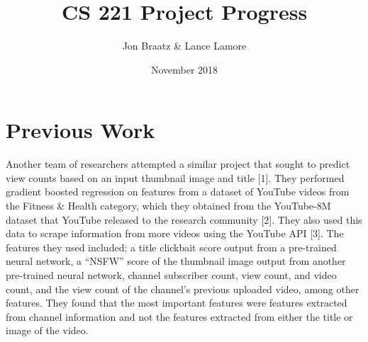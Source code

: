 \documentclass[12pt]{article}
\title{CS 221 Project Progress}
\author{Jon Braatz \& Lance Lamore}
\date{November 2018}
\theoremstyle{definition}
\theoremstyle{remark}
\begin{document}
\maketitle

  
\section{Previous Work}
Another team of researchers attempted a similar project that sought to
predict view counts based on an input thumbnail image and title [1]. They
performed gradient boosted regression on features from 
a dataset of YouTube videos from the Fitness \& Health category,
which they obtained from the YouTube-8M dataset that YouTube released to the
research community [2]. They also used this data to scrape information from more
videos using the YouTube API [3]. The features they used included:
a title clickbait score output from a pre-trained neural network, a ``NSFW''
score of the thumbnail image output from another pre-trained neural network,
channel subscriber count, view count, and video count, and the view count of the
channel's previous uploaded video, among other features. They found that the
most important features were features extracted from channel information and not
the features extracted from either the title or image of the video.
\end{document}
